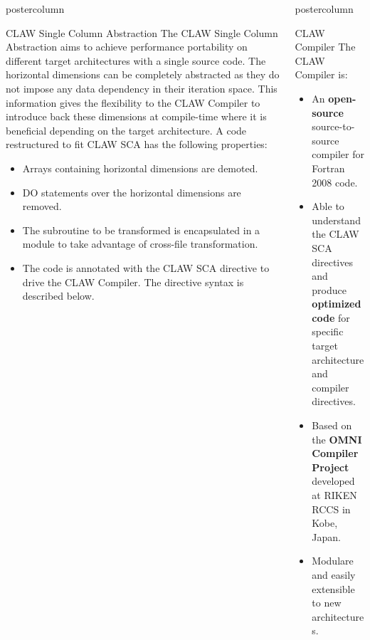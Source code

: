 \documentclass{beamer}
\newlength{\columnheight}
\begin{document}
\begin{frame}
\begin{columns}
\begin{column}{.43\textwidth}
\begin{beamercolorbox}[center]{postercolumn}
\begin{minipage}{.98\textwidth}
{\begin{myblock}{CLAW Single Column Abstraction}
The CLAW Single Column Abstraction aims to achieve performance portability
on different target architectures with a single source code.
The horizontal dimensions can be completely abstracted as they do not impose
any data dependency in their iteration space.
This information gives the flexibility to the CLAW Compiler to introduce
back these dimensions at compile-time where it is beneficial depending on the
target architecture.
A code restructured to fit CLAW SCA has the following properties:
\begin{itemize}
  \item Arrays containing horizontal dimensions are demoted.
  \item DO statements over the horizontal dimensions are removed.
  \item The subroutine to be transformed is encapsulated in a module to take
        advantage of cross-file transformation.
  \item The code is annotated with the CLAW SCA directive to drive the CLAW
        Compiler. The directive syntax is described below.
\end{itemize}

\clawa

\end{myblock}\vfill

}\end{minipage}\end{beamercolorbox}
\end{column}

%
%
\begin{column}{.57\textwidth}
\begin{beamercolorbox}[center]{postercolumn}
\begin{minipage}{.98\textwidth} %
\parbox[t][\columnheight]{\textwidth}{ %

%
%
\begin{myblock}{CLAW Compiler}
The CLAW Compiler is:
\begin{itemize}
  \item An \textbf{open-source} source-to-source compiler for Fortran 2008 code.
  \item Able to understand the CLAW SCA directives and produce \textbf{optimized
        code} for specific target architecture and compiler directives.
  \item Based on the \textbf{OMNI Compiler Project}\cite{Omni} developed at
        RIKEN RCCS in Kobe, Japan.
  \item Modulare and easily extensible to new architectures.
\end{itemize}


\end{myblock}}
\end{minipage}
\end{beamercolorbox}
\end{column}
\end{columns}
\end{frame}
\end{document}
